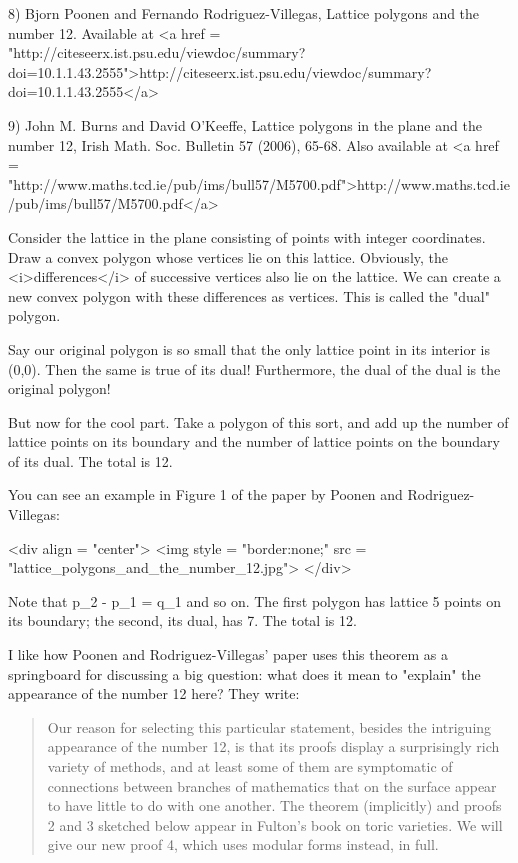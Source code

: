 8) Bjorn Poonen and Fernando Rodriguez-Villegas, Lattice polygons
and the number 12.  Available at 
<a href = "http://citeseerx.ist.psu.edu/viewdoc/summary?doi=10.1.1.43.2555">http://citeseerx.ist.psu.edu/viewdoc/summary?doi=10.1.1.43.2555</a>

9) John M. Burns and David O'Keeffe, Lattice polygons in the plane
and the number 12, Irish Math. Soc. Bulletin 57 (2006), 65-68.
Also available at <a href = "http://www.maths.tcd.ie/pub/ims/bull57/M5700.pdf">http://www.maths.tcd.ie/pub/ims/bull57/M5700.pdf</a>

Consider the lattice in the plane consisting of points with integer
coordinates.  Draw a convex polygon whose vertices lie on this lattice.   
Obviously, the <i>differences</i> of successive vertices also lie on the 
lattice.  We can create a new convex polygon with these differences as 
vertices.  This is called the "dual" polygon.  

Say our original polygon is so small that the only lattice point in its
interior is (0,0).  Then the same is true of its dual!  Furthermore, 
the dual of the dual is the original polygon!

But now for the cool part.  Take a polygon of this sort, and add up the 
number of lattice points on its boundary and the number of lattice 
points on the boundary of its dual.  The total is 12.

You can see an example in Figure 1 of the paper by Poonen and
Rodriguez-Villegas:

<div align = "center">
<img style = "border:none;" src = "lattice_polygons_and_the_number_12.jpg">
</div>

Note that p_{2} - p_{1} = q_{1} and so on.
The first polygon has lattice 5 points on its boundary; the second,
its dual, has 7.  The total is 12.   

I like how Poonen and Rodriguez-Villegas' paper uses this theorem as a
springboard for discussing a big question: what does it mean to
"explain" the appearance of the number 12 here?
They write:

\begin{quote}
   Our reason for selecting this particular statement, besides the 
   intriguing appearance of the number 12, is that its proofs display 
   a surprisingly rich variety of methods, and at least some of them 
   are symptomatic of connections between branches of mathematics that 
   on the surface appear to have little to do with one another.  The 
   theorem (implicitly) and proofs 2 and 3 sketched below appear in 
   Fulton's book on toric varieties.  We will give our new proof 4, 
   which uses modular forms instead, in full.
\end{quote}
    

